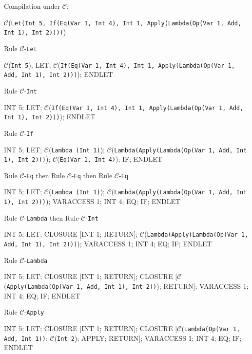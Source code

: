 \documentclass[11pt]{article}
\begin{document}
\begin{landscape}

\noindent Compilation under $\mathcal{C}$:

\bigskip

{\small

\noindent$\mathcal{C}$(\texttt{Let(Int 5, If(Eq(Var 1, Int 4), Int 1, Apply(Lambda(Op(Var 1, Add, Int 1), Int 2))))})

\smallskip
\noindent Rule $\mathcal{C}$-\texttt{Let}
\smallskip

\noindent $\mathcal{C}$(\texttt{Int 5}); LET; $\mathcal{C}$(\texttt{If(Eq(Var 1, Int 4), Int 1, Apply(Lambda(Op(Var 1, Add, Int 1), Int 2)))}); ENDLET

\smallskip
\noindent Rule $\mathcal{C}$-\texttt{Int}
\smallskip

\noindent INT 5; LET; $\mathcal{C}$(\texttt{If(Eq(Var 1, Int 4), Int 1, Apply(Lambda(Op(Var 1, Add, Int 1), Int 2)))}); ENDLET

\smallskip
\noindent Rule $\mathcal{C}$-\texttt{If}
\smallskip

\noindent INT 5; LET; $\mathcal{C}$(\texttt{Lambda (Int 1)}); $\mathcal{C}$(\texttt{Lambda(Apply(Lambda(Op(Var 1, Add, Int 1), Int 2)))}); $\mathcal{C}$(\texttt{Eq(Var 1, Int 4)}); IF; ENDLET


\smallskip
\noindent Rule $\mathcal{C}$-\texttt{Eq} then Rule $\mathcal{C}$-\texttt{Eq} then Rule $\mathcal{C}$-\texttt{Eq}
\smallskip

\noindent INT 5; LET; $\mathcal{C}$(\texttt{Lambda (Int 1)}); $\mathcal{C}$(\texttt{Lambda(Apply(Lambda(Op(Var 1, Add, Int 1), Int 2)))}); VARACCESS 1; INT 4; EQ; IF; ENDLET

\smallskip
\noindent Rule $\mathcal{C}$-\texttt{Lambda} then Rule $\mathcal{C}$-\texttt{Int}
\smallskip

\noindent INT 5; LET; CLOSURE [INT 1; RETURN]; $\mathcal{C}$(\texttt{Lambda(Apply(Lambda(Op(Var 1, Add, Int 1), Int 2)))}); VARACCESS 1; INT 4; EQ; IF; ENDLET

\smallskip
\noindent Rule $\mathcal{C}$-\texttt{Lambda}
\smallskip

\noindent INT 5; LET; CLOSURE [INT 1; RETURN]; CLOSURE [$\mathcal{C}$(\texttt{Apply(Lambda(Op(Var 1, Add, Int 1), Int 2))}); RETURN]; VARACCESS 1; INT 4; EQ; IF; ENDLET

\smallskip
\noindent Rule $\mathcal{C}$-\texttt{Apply}
\smallskip

\noindent INT 5; LET; CLOSURE [INT 1; RETURN]; CLOSURE [$\mathcal{C}$(\texttt{Lambda(Op(Var 1, Add, Int 1))}; $\mathcal{C}$(\texttt{Int 2}); APPLY; RETURN]; VARACCESS 1; INT 4; EQ; IF; ENDLET


}
\end{landscape}
\end{document}
